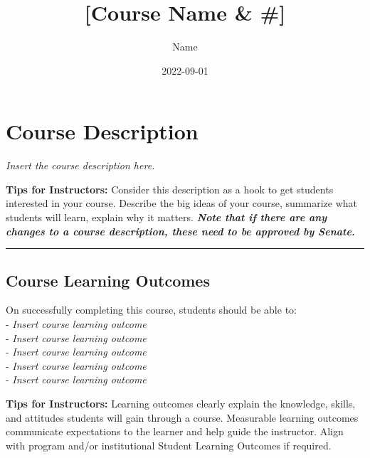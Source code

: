 \documentclass[
]{book}
\title{{[}Course Name \& \#{]}}
\author{Name}
\date{2022-09-01}
\begin{document}
\maketitle

{
\setcounter{tocdepth}{1}
\tableofcontents
}
\hypertarget{course-description}{%
\chapter*{Course Description}\label{course-description}}

\emph{Insert the course description here.}

\begin{feedback}
\textbf{Tips for Instructors:} Consider this description as a hook to
get students interested in your course. Describe the big ideas of your
course, summarize what students will learn, explain why it matters.
\textbf{\emph{Note that if there are any changes to a course
description, these need to be approved by Senate.}}
\end{feedback}

\begin{center}\rule{0.5\linewidth}{0.5pt}\end{center}

\hypertarget{course-learning-outcomes}{%
\section*{Course Learning Outcomes}\label{course-learning-outcomes}}

On successfully completing this course, students should be able to:\\
- \emph{Insert course learning outcome}\\
- \emph{Insert course learning outcome}\\
- \emph{Insert course learning outcome}\\
- \emph{Insert course learning outcome}\\
- \emph{Insert course learning outcome}

\begin{feedback}
\textbf{Tips for Instructors:} Learning outcomes clearly explain the
knowledge, skills, and attitudes students will gain through a course.
Measurable learning outcomes communicate expectations to the learner and
help guide the instructor. Align with program and/or institutional
Student Learning Outcomes if required.
\end{feedback}
\end{document}
